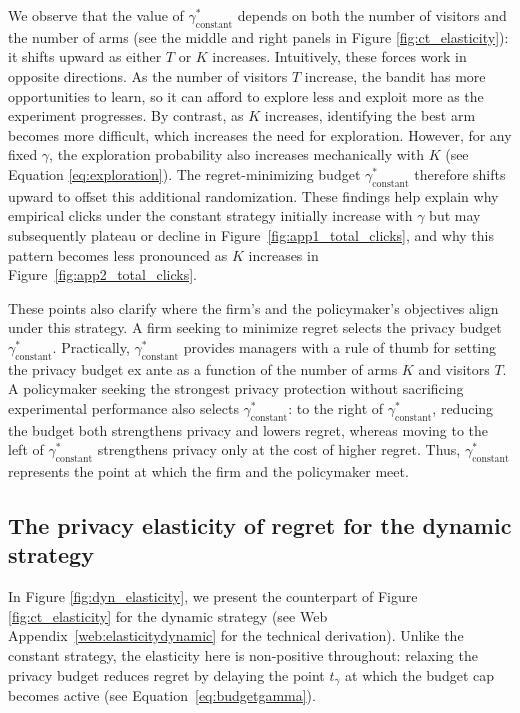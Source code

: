 \documentclass[mksc,nonblindrev]{informs3}
\begin{document}
We observe that the value of $\gamma_{\text{constant}}^{*}$ depends on both the number of visitors and the number of arms (see the middle and right panels in Figure \ref{fig:ct_elasticity}): it shifts upward as either $T$ or $K$ increases. Intuitively, these forces work in opposite directions. As the number of visitors $T$ increase, the bandit has more opportunities to learn, so it can afford to explore less and exploit more as the experiment progresses. By contrast, as $K$ increases, identifying the best arm becomes more difficult, which increases the need for exploration. However, for any fixed $\gamma$, the exploration probability also increases mechanically with $K$ (see Equation \ref{eq:exploration}). The regret-minimizing budget $\gamma_{\text{constant}}^*$ therefore shifts upward to offset this additional randomization. These findings help explain why empirical clicks under the constant strategy initially increase with $\gamma$ but may subsequently plateau or decline in Figure~\ref{fig:app1_total_clicks}, and why this pattern becomes less pronounced as $K$ increases in Figure~\ref{fig:app2_total_clicks}.

These points also clarify where the firm's and the policymaker's objectives align under this strategy. A firm seeking to minimize regret selects the privacy budget $\gamma_{\text{constant}}^*$. Practically, $\gamma_{\text{constant}}^*$ provides managers with a rule of thumb for setting the privacy budget ex ante as a function of the number of arms $K$ and visitors $T$. A policymaker seeking the strongest privacy protection without sacrificing experimental performance also selects $\gamma_{\text{constant}}^*$: to the right of $\gamma_{\text{constant}}^*$, reducing the budget both strengthens privacy and lowers regret, whereas moving to the left of $\gamma_{\text{constant}}^*$ strengthens privacy only at the cost of higher regret. Thus, $\gamma_{\text{constant}}^*$ represents the point at which the firm and the policymaker meet.

\subsection{The privacy elasticity of regret for the dynamic strategy}
In Figure \ref{fig:dyn_elasticity}, we present the counterpart of Figure \ref{fig:ct_elasticity} for the dynamic strategy (see Web Appendix~\ref{web:elasticitydynamic} for the technical derivation). Unlike the constant strategy, the elasticity here is non-positive throughout: relaxing the privacy budget reduces regret by delaying the point $t_\gamma$ at which the budget cap becomes active (see Equation~\ref{eq:budgetgamma}).
\end{document}
